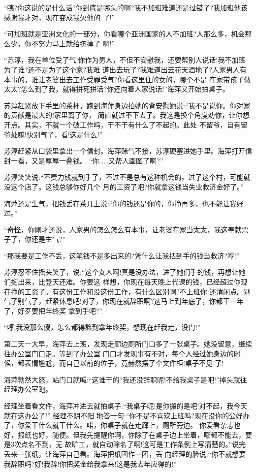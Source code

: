 \documentclass[11pt,a4paper,onecolumn]{article}
\begin{document}
``咦?你这说的是什么话?你到底是哪头的啊?我不加班难道还是过错了?我加班他该感谢我才对，现在变成我欠他的
了!''

``可加班就是亚洲文化的一部分，你看哪个亚洲国家的人不加班?人那么多，机会那么少，你不努力马上就给挤掉了
啊!''

``苏淳，我在单位受了气!你作为男人，不但不安慰我，还要帮别人说话!我不加班为了谁?还不是为了这个家?我难
道出去玩了?我难道出去花天酒地了?人家男人有本事的，谁让老婆出去工作受罪受气?你看这里住的女的，哪个不是
在家带孩子做太太?怎么到了我，就得拼死拼活?你还向着人家说话!''海萍又开始拍桌子。

苏淳赶紧放下手里的茶杯，跑到海萍身边拍她的背安慰她说:``我不是说你。你对家的贡献是最大的!家里离了你，
简直就过不下去了。我这是换个角度劝你，让你想开点。其实，不就一个破工作吗，干不干有什么了不起的。此处
不留爷，自有留爷处嘛!快别气了，看!这是什么!''

苏淳赶紧从口袋里拿出一个信封。海萍赌气不接，苏淳硬塞进她手里。海萍打开信封一看，又是厚厚一叠钱。
``你……又帮人画图了啊?''

苏淳笑笑说:``不费力钱就到手了，不过不是总有这种机会的。过了这个村，可能就没这个店了。这钱总够你好几个
月的工资了吧?你就拿这钱当失业救济金好了。''

海萍还是生气，把钱丢在茶几上说:``你的钱还是你的，你挣再多，也不能让我好过。''

``奇怪，你刚才还说，人家男的怎么怎么有本事，让老婆在家当太太，我这奉献票子了，你还是生气?''

``那我要是工作不丢，这笔钱不是多出来的?凭什么让我把到手的钱当救济?哼!''

苏淳忍不住摇头笑了，说:``这个女人啊!真是没办法，进了她们手的钱，再想让她们掏出来，比登天还难。你要这
样想，你现在每天晚上代课的钱，已经超过你现在挣的工资了。有这份工作和没这份工作，有什么区别啊?不上班你
还清闲点。别气了别气了，赶紧休息吧!对了，你现在就辞职啊?这马上到年底了，你都干一年了，好歹要把年终奖
拿到手吧?''

``哼!我没那么傻，怎么都得熬到拿年终奖，想现在赶我走，没门!''

第二天一大早，海萍去上班，发现走廊边厕所门口多了一张桌子。她没留意，继续往办公室门口走。等到了办公室
门口才发现事有不对，每个人经过她身边的时候，都表情尴尬，而自己以前的位子，竟赫然摆了个文件柜!桌子不见
了!

海萍勃然大怒，站门口就喊:``这谁干的?我还没辞职呢!不给我桌子是吧!''掉头就往经理办公室跑。

经理坐着看文件，海萍冲进去就拍桌子:``我桌子呢!是你搬的是吧!对不起，我今天就在这办公了!'' 经理不阴不阳
地答一句:``你不是不喜欢上班吗?现在没你的公好办了，你爱干什么就干什么。喏，你桌子就在走廊上，厕所旁边。
你爱看杂志也好，报纸也好，随便。但我先提醒你啊，你除了在桌子边上坐着，哪都不能去，要是3次点名不到，无
故旷工，就自动除名了啊!这可是工作条例上写清楚的。''说完丢来一张纸，让海萍自己看。海萍把纸团作一团，丢
向经理的脸说:``你不就想要我辞职吗?好!我辞!你把奖金给我拿来!这是我去年应得的!''
\end{document}
